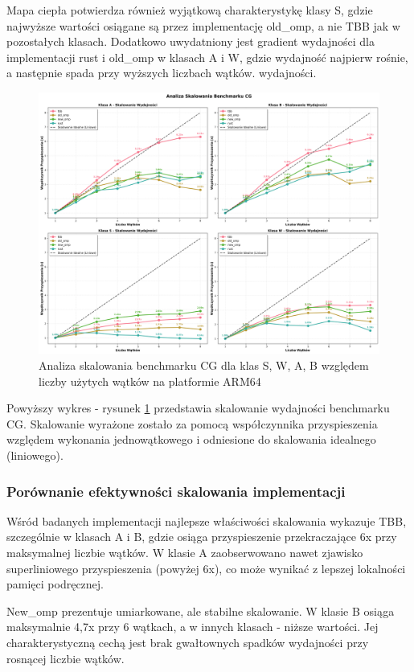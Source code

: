 Mapa ciepła potwierdza również wyjątkową charakterystykę klasy S, gdzie najwyższe wartości osiągane są przez implementację old\_omp, a nie TBB jak w pozostałych klasach. Dodatkowo uwydatniony jest gradient wydajności dla implementacji rust i old\_omp w klasach A i W, gdzie wydajność najpierw rośnie, a następnie spada przy wyższych liczbach wątków. wydajności.

\begin{figure}[H]
    \centering
    \includegraphics[width=\textwidth]{analiza/images/parallel/cg/x86/cg_analiza_skalowania.png}
    \caption{Analiza skalowania benchmarku CG dla klas S, W, A, B względem liczby użytych wątków na platformie ARM64}
    \label{cg_analiza_skalowania_x86_64}
\end{figure}
Powyższy wykres - rysunek \ref{cg_analiza_skalowania_x86_64} przedstawia skalowanie wydajności benchmarku CG. Skalowanie wyrażone zostało za pomocą współczynnika przyspieszenia względem wykonania jednowątkowego i odniesione do skalowania idealnego (liniowego).
\subsubsection{Porównanie efektywności skalowania implementacji}
Wśród badanych implementacji najlepsze właściwości skalowania wykazuje TBB, szczególnie w klasach A i B, gdzie osiąga przyspieszenie przekraczające 6x przy maksymalnej liczbie wątków. W klasie A zaobserwowano nawet zjawisko superliniowego przyspieszenia (powyżej 6x), co może wynikać z lepszej lokalności pamięci podręcznej.

New\_omp prezentuje umiarkowane, ale stabilne skalowanie. W klasie B osiąga maksymalnie 4,7x przy 6 wątkach, a w innych klasach - niższe wartości. Jej charakterystyczną cechą jest brak gwałtownych spadków wydajności przy rosnącej liczbie wątków.

